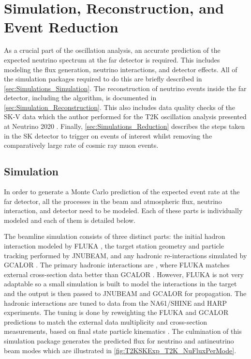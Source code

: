 \chapter{Simulation, Reconstruction, and Event Reduction}
\label{chap:Simulations}

As a crucial part of the oscillation analysis, an accurate prediction of the expected neutrino spectrum at the far detector is required. This includes modeling the flux generation, neutrino interactions, and detector effects. All of the simulation packages required to do this are briefly described in \autoref{sec:Simulations_Simulation}. The reconstruction of neutrino events inside the far detector, including the \fq algorithm, is documented in \autoref{sec:Simulation_Reconstruction}. This also includes data quality checks of the SK-V data which the author performed for the T2K oscillation analysis presented at Neutrino 2020 \cite{Dunne2020-uf}. Finally, \autoref{sec:Simulations_Reduction} describes the steps taken in the SK detector to trigger on events of interest whilst removing the comparatively large rate of cosmic ray muon events.

\section{Simulation}
\label{sec:Simulations_Simulation}

In order to generate a Monte Carlo prediction of the expected event rate at the far detector, all the processes in the beam and atmospheric flux, neutrino interaction, and detector need to be modeled. Each of these parts is individually modeled and each of them is detailed below.

The beamline simulation consists of three distinct parts: the initial hadron interaction modeled by FLUKA \cite{fluka2011}, the target station geometry and particle tracking performed by JNUBEAM, \cite{geant3, PhysRevD.87.012001} and any hadronic re-interactions simulated by GCALOR \cite{gcalor}. The primary hadronic interactions are , where FLUKA matches external cross-section data better than GCALOR \cite{t2k_tn_flux}. However, FLUKA is not very adaptable so a small simulation is built to model the interactions in the target and the output is then passed to JNUBEAM and GCALOR for propagation. The hadronic interactions are tuned to data from the NA61/SHINE \cite{Abgrall_2011, Abgrall_2012, NA61_pions_rep} and HARP \cite{harp} experiments. The tuning is done by reweighting the FLUKA and GCALOR predictions to match the external data multiplicity and cross-section measurements, based on final state particle kinematics \cite{t2k_tn_flux}. The culmination of this simulation package generates the predicted flux for neutrino and antineutrino beam modes which are illustrated in \autoref{fig:T2KSKExp_T2K_NuFluxPerMode}.

